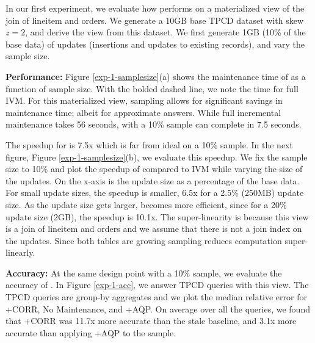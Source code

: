 
In our first experiment, we evaluate how \svc performs on a materialized view of the join of \textsf{lineitem} and \textsf{orders}.
We generate a 10GB base TPCD dataset with skew $z=2$, and derive the view from this dataset.
We first generate 1GB (10\% of the base data) of updates (insertions and updates to existing records), and vary the sample size.

\textbf{Performance:}
Figure \ref{exp-1-samplesize}(a) shows the maintenance time of \svc as a function of sample size.
With the bolded dashed line, we note the time for full IVM. 
For this materialized view, sampling allows for significant savings in maintenance time; albeit for approximate answers.
While full incremental maintenance takes 56 seconds, \svc with a 10\% sample can complete in 7.5 seconds.

The speedup for  is 7.5x which is far from ideal on a 10\% sample.
In the next figure, Figure \ref{exp-1-samplesize}(b), we evaluate this speedup. 
We fix the sample size to 10\% and plot the speedup of \svc compared to IVM while varying the size of the updates.
On the x-axis is the update size as a percentage of the base data.
For small update sizes, the speedup is smaller, 6.5x for a 2.5\% (250MB) update size.
As the update size gets larger, \svc becomes more efficient, since for a 20\% update size (2GB), the speedup is 10.1x. 
The super-linearity is because this view is a join of \textsf{lineitem} and \textsf{orders} and we assume that there is not a join index on the updates.
Since both tables are growing sampling reduces computation super-linearly. 

\textbf{Accuracy:}
At the same design point with a 10\% sample, we evaluate the accuracy of \svc.
In Figure \ref{exp-1-acc}, we answer TPCD queries with this view.
The TPCD queries are group-by aggregates and we plot the median relative error for \svcnospace+CORR, No Maintenance, and \svcnospace+AQP.
On average over all the queries, we found that \svcnospace+CORR was 11.7x more accurate than the stale baseline, and 3.1x more accurate than applying \svcnospace+AQP to the sample.

